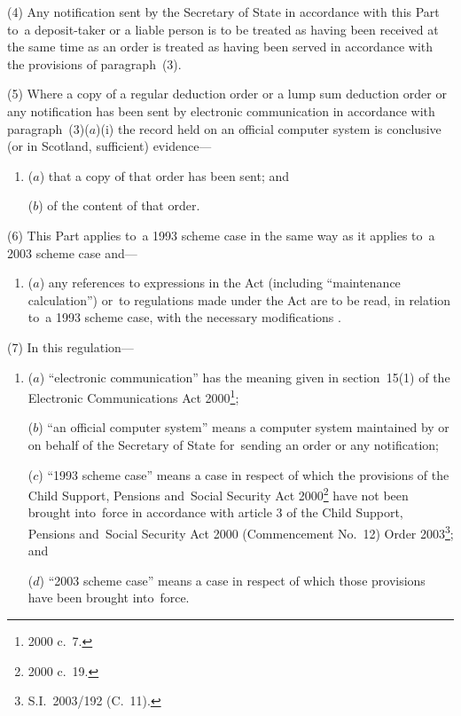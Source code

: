 \documentclass[12pt,a4paper]{article}
\begin{document}
(4) Any notification sent by the 
Secretary of State  %
in accordance with this Part to~a deposit-taker or a liable person is to be treated as having been received at the same time as an order is treated as having been served in accordance with the provisions of paragraph~(3).

(5) Where a copy of a regular deduction order or a lump sum deduction order or any notification has been sent by electronic communication in accordance with paragraph~(3)($a$)(i)  the record held on an official computer system is conclusive (or in Scotland, sufficient) evidence—
\begin{enumerate}\item[]
($a$) that a copy of that order has been sent; and

($b$) of the content of that order.
\end{enumerate}

(6) This Part applies to~a 1993 scheme case in the same way as it applies to~a 2003 scheme case and—
\begin{enumerate}\item[]
($a$) any references to expressions in the Act (including “maintenance calculation”) or~to regulations made under the Act are to be read, in relation to~a 1993 scheme case, with the necessary modifications%
%
.
\end{enumerate}

(7) In this regulation—
\begin{enumerate}\item[]
($a$) “electronic communication” has the meaning given in section~15(1) of the Electronic Communications Act 2000\footnote{2000 c.~7.};

($b$) “an official computer system” means a computer system maintained by or on behalf of the 
Secretary of State  %
for~sending an order or any notification;

($c$) “1993 scheme case” means a case in respect of which the provisions of the Child Support, Pensions and~Social Security Act 2000\footnote{2000 c.~19.} have not been brought into~force in accordance with article 3 of the Child Support, Pensions and~Social Security Act 2000 (Commencement No.~12) Order 2003\footnote{S.I.~2003/192 (C.~11).}; and

($d$) “2003 scheme case” means a case in respect of which those provisions have been brought into~force.
\end{enumerate}
\end{document}
